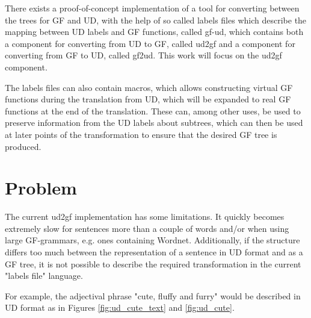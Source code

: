 \documentclass{article}
\begin{document}
There exists a proof-of-concept implementation of a tool for converting between the trees for GF and UD,
with the help of so called labels files which describe the mapping between UD labels and GF functions,
called gf-ud, which contains both a component for converting from UD to GF, called ud2gf\cite{kolachina-ranta-2017}
and a component for converting from GF to UD, called gf2ud\cite{kolachina-ranta-2016}. This work will focus on the ud2gf component.

The labels files can also contain macros, which allows constructing virtual GF functions during the translation from UD, which will be expanded to real GF functions at the end of the translation.
These can, among other uses, be used to preserve information from the UD labels about subtrees, which can then be used at later points of the transformation to ensure that the desired GF tree is produced.






\section{Problem}


The current ud2gf implementation has some limitations. It quickly becomes extremely slow for sentences more than a couple of words and/or
when using large GF-grammars, e.g. ones containing Wordnet\cite{angelov2016predicting}. Additionally, if the structure differs too much between the representation of a sentence in UD format and as a GF tree, it is not possible to describe the required transformation in the current "labels file" language.

For example, the adjectival phrase "cute, fluffy and furry"
would be described in UD format as in Figures \ref{fig:ud_cute_text} and \ref{fig:ud_cute}.
\end{document}
